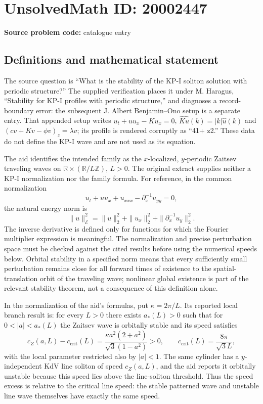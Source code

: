 \documentclass[11pt]{article}
\newcommand{\Z}{\mathbb{Z}}
\newcommand{\R}{\mathbb{R}}
\begin{document}
\section*{UnsolvedMath ID: 20002447}
\textbf{Source problem code:} catalogue entry
\subsection{Definitions and mathematical statement}
The source question is ``What is the stability of the KP-I soliton solution with periodic structure?'' The supplied verification places it under M. Haragus, ``Stability for KP-I profiles with periodic structure,'' and diagnoses a record-boundary error: the subsequent J. Albert Benjamin--Ono setup is a separate entry. That appended setup writes $u_t+uu_x-Ku_x=0$, $\widehat{Ku}(k)=|k|\widehat u(k)$ and $(cv+Kv-\phi v)_z=\lambda v$; its profile is rendered corruptly as ``41+ z2.'' These data do not define the KP-I wave and are not used as its equation.

The aid identifies the intended family as the $x$-localized, $y$-periodic Zaitsev traveling waves on $\R\times(\R/L\Z)$, $L>0$. The original extract supplies neither a KP-I normalization nor the family formula. For reference, in the common normalization
\[
 u_t+uu_x+u_{xxx}-\partial_x^{-1}u_{yy}=0,
\]
the natural energy norm is
\[
 \|u\|_{\mathcal E}^2=\|u\|_2^2+\|u_x\|_2^2+\|\partial_x^{-1}u_y\|_2^2.
\]
The inverse derivative is defined only for functions for which the Fourier multiplier expression is meaningful. The normalization and precise perturbation space must be checked against the cited results before using the numerical speeds below. Orbital stability in a specified norm means that every sufficiently small perturbation remains close for all forward times of existence to the spatial-translation orbit of the traveling wave; nonlinear global existence is part of the relevant stability theorem, not a consequence of this definition alone.

In the normalization of the aid's formulas, put $\kappa=2\pi/L$. Its reported local branch result is: for every $L>0$ there exists $a_*(L)>0$ such that for $0<|a|<a_*(L)$ the Zaitsev wave is orbitally stable and its speed satisfies
\[
 c_Z(a,L)-c_{\mathrm{crit}}(L)
 =\frac{\kappa a^2(2+a^2)}{\sqrt3(1-a^2)}>0,
 \qquad c_{\mathrm{crit}}(L)=\frac{8\pi}{\sqrt3 L},
\]
with the local parameter restricted also by $|a|<1$. The same cylinder has a $y$-independent KdV line soliton of speed $c_Z(a,L)$, and the aid reports it orbitally unstable because this speed lies above the line-soliton threshold. Thus the speed excess is relative to the critical line speed: the stable patterned wave and unstable line wave themselves have exactly the same speed.
\end{document}
